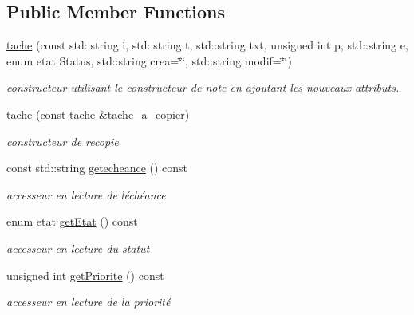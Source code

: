 \subsection*{Public Member Functions}
\begin{DoxyCompactItemize}
\item 
\hyperlink{classtache_a88ffefc43bb6ee19cb9c6741551ec606}{tache} (const std\+::string i, std\+::string t, std\+::string txt, unsigned int p, std\+::string e, enum etat Status, std\+::string crea=\char`\"{}\char`\"{}, std\+::string modif=\char`\"{}\char`\"{})
\begin{DoxyCompactList}\small\item\em constructeur utilisant le constructeur de note en ajoutant les nouveaux attributs. \end{DoxyCompactList}\item 
\mbox{\label{classtache_a6d56536f238c28e385a94ba7db828b00}} 
\hyperlink{classtache_a6d56536f238c28e385a94ba7db828b00}{tache} (const \hyperlink{classtache}{tache} \&tache\+\_\+a\+\_\+copier)
\begin{DoxyCompactList}\small\item\em constructeur de recopie \end{DoxyCompactList}\item 
\mbox{\label{classtache_a6cb88e9c76bba2ba9cdbcb4a24533138}} 
const std\+::string \hyperlink{classtache_a6cb88e9c76bba2ba9cdbcb4a24533138}{getecheance} () const
\begin{DoxyCompactList}\small\item\em accesseur en lecture de l\textquotesingle{}échéance \end{DoxyCompactList}\item 
\mbox{\label{classtache_a428f13ec94d058a857a7e060cd69d1f7}} 
enum etat \hyperlink{classtache_a428f13ec94d058a857a7e060cd69d1f7}{get\+Etat} () const
\begin{DoxyCompactList}\small\item\em accesseur en lecture du statut \end{DoxyCompactList}\item 
\mbox{\label{classtache_abc6d0d265927c2cd4f7e9cb21643ccbb}} 
unsigned int \hyperlink{classtache_abc6d0d265927c2cd4f7e9cb21643ccbb}{get\+Priorite} () const
\begin{DoxyCompactList}\small\item\em accesseur en lecture de la priorité \end{DoxyCompactList}\item 

\end{DoxyCompactItemize}
